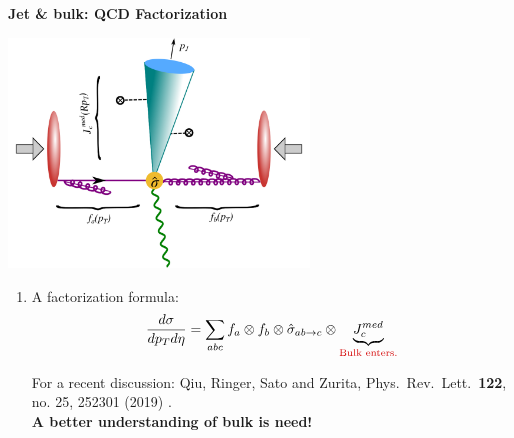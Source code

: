 \documentclass[9pt,a4paper,unknownkeysallowed,xcolor=dvipsnames,aspectratio=43]{beamer}
\begin{document}
\begin{frame}{\bf\huge Jet \& bulk: QCD Factorization}	\vspace{4mm}
\begin{center}
\includegraphics[width=0.6\textwidth]{fig/facotrization}\\
\end{center}
\begin{enumerate}
\item{A factorization formula:}
\begin{align}
    \frac{d\sigma}{dp_{T} d\eta} =\sum\limits_{abc}f_a\otimes f_b \otimes \hat{\sigma}_{ab\to c}\otimes \underbrace{J_c^{med}}_{\text{\color{darkred}Bulk enters.}}\notag
\end{align}
\begin{center}
{\tiny  For a recent discussion: {\color{teablue}
  Qiu, Ringer, Sato and Zurita,
  Phys.\ Rev.\ Lett.\  {\bf 122}, no. 25, 252301 (2019)
  .
  }}\\
  \vspace{2mm}
 {\color{darkred}\bf A better understanding of bulk is need!
 }
\end{center}
\end{enumerate}
\end{frame}
%
%
\end{document}

